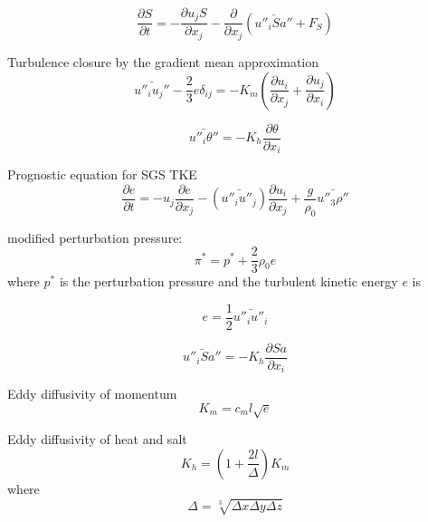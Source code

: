 \documentclass[letterpaper,10pt]{report}
\begin{document}
	\begin{equation} \label{eq:saprog}
	\frac{\partial S}{\partial t} = -\frac{\partial u_j S}{\partial x_j} - \frac{\partial}{\partial x_j}(\bar{u''_i Sa''} + F_S)
	\end{equation}
	
	Turbulence closure by the gradient mean approximation
	\begin{equation} \label{eq:momdiff}
	\bar{u''_i u_j''} - \frac{2}{3}e \delta_{ij} = -K_m(\frac{\partial u_i}{\partial x_j} + \frac{\partial u_j}{\partial x_i})
	\end{equation}
	
	\begin{equation} \label{eq:ptdiff}
	\bar{u''_i \theta''} = -K_h \frac{\partial \theta}{\partial x_i}
	\end{equation}
	
	Prognostic equation for SGS TKE
	\begin{equation} \label{eq:eprog}
	\frac{\partial e}{\partial t} = -u_j \frac{\partial e}{\partial x_j} - (\bar{u''_i u''_j})\frac{\partial u_i}{\partial x_j} + \frac{g}{\rho_0}\bar{u''_3 \rho''}
	\end{equation}
	
	modified perturbation pressure:
	\begin{equation} \label{eq:pi}
	\pi^* = p^* + \frac{2}{3}\rho_0 e
	\end{equation}
	where $p^*$ is the perturbation pressure and the turbulent kinetic energy $e$ is

	\begin{equation} \label{eq:e}
	e = \frac{1}{2}\bar{u''_i u''_i}
	\end{equation}
	
	\begin{equation} \label{eq:sadiff}
	\bar{u''_i Sa''} = -K_h \frac{\partial Sa}{\partial x_i}
	\end{equation}
	
	Eddy diffusivity of momentum
	\begin{equation} \label{eq:Km}
	K_m = c_m l \sqrt{e}
	\end{equation}

	Eddy diffusivity of heat and salt
	\begin{equation} \label{eq:Kh}
	K_h = (1+\frac{2l}{\Delta})K_m
	\end{equation}
    where
	\begin{equation} \label{eq:gridl}
	\Delta = \sqrt[3]{\Delta x \Delta y \Delta z}
	\end{equation}
	
\end{document}
